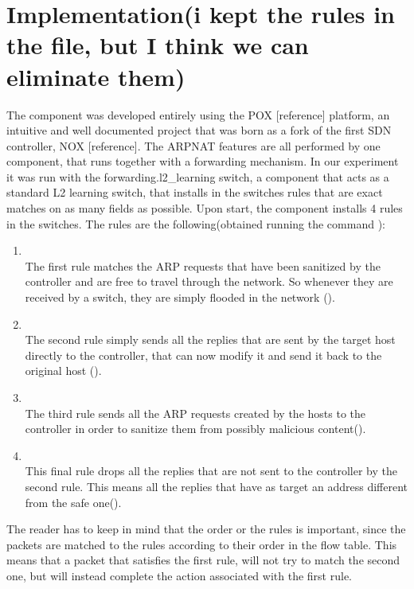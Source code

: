 \documentclass[11pt]{article}
\newcommand*{\code}{\fontfamily{lmtt}\selectfont}
\begin{document}
\section{Implementation(i kept the rules in the file, but I think we can eliminate them)}
The component was developed entirely using the POX [reference] platform, an intuitive and well documented project that was born as a fork of the first SDN controller, NOX [reference].
The ARPNAT features are all performed by one component, that runs together with a forwarding mechanism. In our experiment it was run with the forwarding.l2\_learning switch, a component that acts as a standard L2 learning switch, that installs in the switches rules that are exact matches on as many fields as possible.
Upon start, the component installs 4 rules in the switches. The rules are the following(obtained running the command {\code{ovs-ofctl dump-flows s1}}):
\begin{enumerate}
\item {\code{cookie=0x0, duration=211.220s, table=0, n\_packets=0, n\_bytes=0, idle\_age=211, priority=28672, arp, dl\_src=00:11:22:33:44:55, arp\_spa=10.0.0.100,arp\_op=1 actions=FLOOD}}\\

The first rule matches the ARP requests that have been sanitized by the controller and are free to travel through the network. So whenever they are received by a switch, they are simply flooded in the network ({\code{actions=FLOOD}}).
\item {\code{cookie=0x0, duration=211.180s, table=0, n\_packets=0, n\_bytes=0, idle\_age=211, priority=28672, arp, dl\_dst=00:11:22:33:44:55, arp\_tpa=10.0.0.100, arp\_op=2 actions=CONTROLLER:65535}}\\

The second rule simply sends all the replies that are sent by the target host directly to the controller, that can now modify it and send it back to the original host ({\code{action=CONTROLLER:65535}}).
\item {\code{cookie=0x0, duration=211.180s, table=0, n\_packets=0, n\_bytes=0, idle\_age=211, priority=28672, arp, arp\_op=1 actions=CONTROLLER:65535}}\\

The third rule sends all the ARP requests created by the hosts to the controller in order to sanitize them from possibly malicious content({\code{action=CONTROLLER:65535}}).
\item  {\code{cookie=0x0, duration=211.180s, table=0, n\_packets=0, n\_bytes=0, idle\_age=211, priority=28672, arp, arp\_op=2 actions=ANY}}\\

This final rule drops all the replies that are not sent to the controller by the second rule. This means all the replies that have as target an address different from the safe one({\code{action=ANY}}).
\end{enumerate}
The reader has to keep in mind that the order or the rules is important, since the packets are matched to the rules according to their order in the flow table. This means that a packet that satisfies the first rule, will not try to match the second one, but will instead complete the action associated with the first rule.
\end{document}
